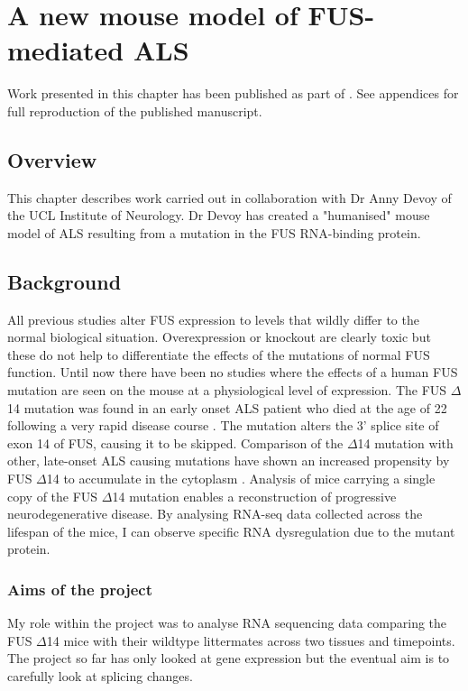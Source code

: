 \chapter{A new mouse model of FUS-mediated ALS}
\label{chapter:fus_mouse}

Work presented in this chapter has been published as part of \citep{Devoy2017}. See appendices for full reproduction of the published manuscript.


\section{Overview}
This chapter describes work carried out in collaboration with Dr Anny Devoy of the UCL Institute of Neurology. Dr Devoy has created a "humanised" mouse model of ALS resulting from a mutation in the FUS RNA-binding protein. 

\section{Background}
All previous studies alter FUS expression to levels that wildly differ to the normal biological situation. Overexpression or knockout are clearly toxic but these do not help to differentiate the effects of the mutations of normal FUS function. Until now there have been no studies where the effects of a human FUS mutation are seen on the mouse at a physiological level of expression. 
The FUS $\Delta$14 mutation was found in an early onset ALS patient who died at the age of 22 following a very rapid disease course \citep{DeJesus-Hernandez2010}. The mutation alters the 3' splice site of exon 14 of FUS, causing it to be skipped.  Comparison of the $\Delta$14 mutation with other, late-onset ALS causing mutations have shown an increased propensity by FUS $\Delta$14 to accumulate in the cytoplasm \citep{Verbeeck2012}. Analysis of mice carrying a single copy of the FUS $\Delta$14 mutation enables a reconstruction of progressive neurodegenerative disease. By analysing RNA-seq data collected across the lifespan of the mice, I can observe specific RNA dysregulation due to the mutant protein.


\subsection{Aims of the project}
My role within the project was to analyse RNA sequencing data comparing the FUS $\Delta$14 mice with their wildtype littermates across two tissues and timepoints. The project so far has only looked at gene expression but the eventual aim is to carefully look at splicing changes.


